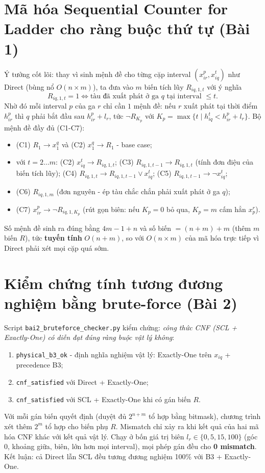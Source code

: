 \documentclass[12pt, a4paper]{article}
\begin{document}
\section{Mã hóa Sequential Counter for Ladder cho ràng buộc thứ tự (Bài 1)}
Ý tưởng cốt lõi: thay vì sinh mệnh đề cho từng cặp interval $(x_{ir}^p, x_{iq}^t)$ như Direct (bùng nổ $O(n \times m)$), ta đưa vào $m$ biến tích lũy $R_{iq, 1, t}$ với ý nghĩa
$$
    R_{iq, 1, t} = 1 \Leftrightarrow \text{tàu đã xuất phát ở ga } q \text{ tại interval } \le t .
$$
Nhờ đó mỗi interval $p$ của ga $r$ chỉ cần $1$ mệnh đề: nếu $r$ xuất phát tại thời điểm $h_{ir}^p$ thì $q$ phải bắt đầu sau $h_{ir}^p + l_r$, tức $\neg R_{K_p}$ với $K_p = \max\{t \mid h_{iq}^t < h_{ir}^p + l_r\}$. Bộ mệnh đề đầy đủ (C1-C7):
\begin{itemize}
    \item (C1) $R_1 \rightarrow x^q_1$ và (C2) $x^q_1 \rightarrow R_1$ - base case;
    \item với $t = 2 \dots m$: (C2) $x_{iq}^t \rightarrow R_{iq, 1, t}$; (C3) $R_{iq, 1, t-1} \rightarrow R_{iq, 1, t}$ (tính đơn điệu của biến tích lũy); (C4) $R_{iq, 1, t} \rightarrow R_{iq, 1, t-1} \lor x_{iq}^t$; (C5) $R_{iq, 1, t-1} \rightarrow \neg x_{iq}^t$;
    \item (C6) $R_{iq, 1, m}$ (đơn nguyên - ép tàu chắc chắn phải xuất phát ở ga $q$);
    \item (C7) $x_{ir}^{p} \rightarrow \neg R_{iq, 1, K_p}$ (rút gọn biên: nếu $K_p = 0$ bỏ qua, $K_p = m$ cấm hẳn $x^r_p$).
\end{itemize}
Số mệnh đề sinh ra đúng bằng $4m - 1 + n$ và số biến $= (n + m) + m$ (thêm $m$ biến $R$), tức \textbf{tuyến tính} $O(n + m)$, so với $O(n \times m)$ của mã hóa trực tiếp vì Direct phải xét mọi cặp quá sớm.

\section{Kiểm chứng tính tương đương nghiệm bằng brute-force (Bài 2)}
Script \texttt{bai2\_bruteforce\_checker.py} kiểm chứng: \emph{công thức CNF (SCL + Exactly-One) có diễn đạt đúng ràng buộc vật lý không}:
\begin{enumerate}[label = (\roman*)]
    \item \texttt{physical\_b3\_ok} - định nghĩa nghiệm vật lý: Exactly-One trên $x_{iq}$ + precedence B3;
    \item \texttt{cnf\_satisfied} với Direct + Exactly-One;
    \item \texttt{cnf\_satisfied} với SCL + Exactly-One khi có gán biến $R$.
\end{enumerate}
Với mỗi gán biến quyết định (duyệt đủ $2^{n+m}$ tổ hợp bằng bitmask), chương trình xét thêm $2^m$ tổ hợp cho biến phụ $R$. Mismatch chỉ xảy ra khi kết quả của hai mã hóa CNF khác với kết quả vật lý. Chạy ở bốn giá trị biên $l_r \in \{0, 5, 15, 100\}$ (góc 0, khoảng giữa, biên, lớn hơn mọi interval), mọi phép gán đều cho \textbf{0 mismatch}. Kết luận: cả Direct lẫn SCL đều tương đương nghiệm 100\% với B3 + Exactly-One.
\end{document}
